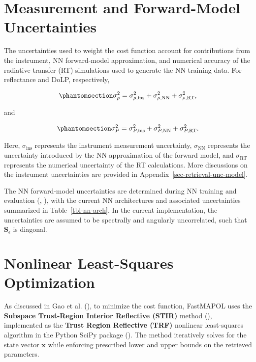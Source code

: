 \documentclass[
  11pt,
  letterpaper,
]{scrreprt}
\begin{document}
\section{Measurement and Forward-Model
Uncertainties}\label{measurement-and-forward-model-uncertainties}

The uncertainties used to weight the cost function account for
contributions from the instrument, NN forward-model approximation, and
numerical accuracy of the radiative transfer (RT) simulations used to
generate the NN training data. For reflectance and DoLP, respectively,

\begin{equation}\phantomsection\label{eq-sigma-rho}{
\sigma_\rho^2
=
\sigma_{\rho,\mathrm{ins}}^2
+
\sigma_{\rho,\mathrm{NN}}^2
+
\sigma_{\rho,\mathrm{RT}}^2,
}\end{equation}

and

\begin{equation}\phantomsection\label{eq-sigma-P}{
\sigma_P^2
=
\sigma_{P,\mathrm{ins}}^2
+
\sigma_{P,\mathrm{NN}}^2
+
\sigma_{P,\mathrm{RT}}^2.
}\end{equation}

Here, \(\sigma_{\mathrm{ins}}\) represents the instrument measurement
uncertainty, \(\sigma_{\mathrm{NN}}\) represents the uncertainty
introduced by the NN approximation of the forward model, and
\(\sigma_{\mathrm{RT}}\) represents the numerical uncertainty of the RT
calculations. More discussions on the instrument uncertainties are
provided in Appendix~\ref{sec-retrieval-unc-model}.

The NN forward-model uncertainties are determined during NN training and
evaluation (,
), with the current NN architectures and
associated uncertainties summarized in Table~\ref{tbl-nn-arch}. In the
current implementation, the uncertainties are assumed to be spectrally
and angularly uncorrelated, such that \(\mathbf{S}_{\epsilon}\) is
diagonal.

\section{Nonlinear Least-Squares
Optimization}\label{nonlinear-least-squares-optimization}

As discussed in Gao et al. (), to
minimize the cost function, FastMAPOL uses the \textbf{Subspace
Trust-Region Interior Reflective (STIR)} method
(), implemented as the
\textbf{Trust Region Reflective (TRF)} nonlinear least-squares algorithm
in the Python SciPy package (). The method iteratively solves for the state vector
\(\mathbf{x}\) while enforcing prescribed lower and upper bounds on the
retrieved parameters.
\end{document}
